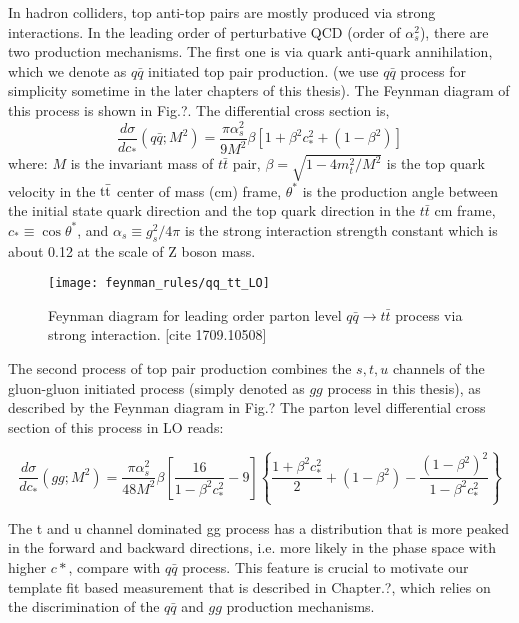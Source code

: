 In hadron colliders, top anti-top pairs are mostly produced via strong interactions. In the leading order of perturbative QCD (order of $\alpha_s^2$), there are two production mechanisms. The first one is via quark anti-quark annihilation, which we denote as $q\bar{q}$ initiated top pair production. (we use $q\bar q$ process for simplicity sometime in the later chapters of this thesis). The Feynman diagram of this process is shown in Fig.?. The differential cross section is,
\begin{equation}
\frac{d\sigma}{dc_*}(q\bar q;M^2) = \frac{\pi\alpha_s^2}{9M^2}\beta\left[1+\beta^2c_*^2+\left(1-\beta^2\right)\right]
\label{eq:qq_xsec_LO}
\end{equation}
where: $M$ is the invariant mass of $t\bar t$ pair, $\beta=\sqrt{1-4m_t^2/M^2}$ is the top quark velocity in the $\mathrm{t \bar{t}}$ center of mass (cm) frame,  $\theta^*$ is the production angle between the initial state quark direction and the top quark direction in the $t\bar t$ cm frame, $c_*\equiv\cos{\theta^*}$, and $\alpha_s\equiv g_s^2/4\pi$ is the strong interaction strength constant which is about 0.12 at the scale of Z boson mass.

\begin{figure}[hbt]
  \begin{center}
    \texttt{[image: feynman\_rules/qq\_tt\_LO]}
  \caption{\small Feynman diagram for leading order parton level $q\bar q \rightarrow t\bar t$ process via strong interaction. [cite 1709.10508]}
    \label{fig:qq_tt_LO}
  \end{center}
\end{figure}

The second process of top pair production combines the $s,t,u$ channels of the gluon-gluon initiated process (simply denoted as $gg$ process in this thesis), as described by the Feynman diagram in Fig.? The parton level differential cross section of this process in LO reads:

\begin{equation}
\frac{d\sigma}{dc_*}(gg;M^2) = \frac{\pi\alpha_s^2}{48M^2}\beta\left[\frac{16}{1-\beta^2c_*^2}-9\right]\left\lbrace\frac{1+\beta^2c_*^2}{2}+(1-\beta^2)-\frac{(1-\beta^2)^2}{1-\beta^2c_*^2}\right\rbrace
\label{eq:gg_xsec_LO}
\end{equation}

The t and u channel dominated gg process has a distribution that is more peaked in the forward and backward directions, i.e. more likely in the phase space with higher $c*$, compare with $q\bar q$ process. This feature is crucial to motivate our template fit based measurement that is described in Chapter.?, which relies on the discrimination of the $q\bar q$ and $gg$ production mechanisms.

